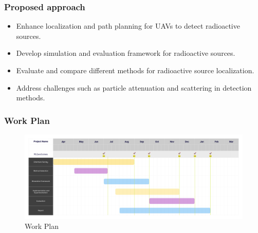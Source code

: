 \documentclass[aspectratio=169]{beamer}
\begin{document}
\begin{frame}
  \frametitle{Proposed approach}
  

  \begin{itemize}
    \item Enhance localization and path planning for UAVs to detect radioactive sources.
    \item Develop simulation and evaluation framework for radioactive sources.
    \item Evaluate and compare different methods for radioactive source localization.
    \item Address challenges such as particle attenuation and scattering in detection methods.
  \end{itemize}
      
  

  
    
\end{frame}

\begin{frame}
\frametitle{Work Plan}
\begin{figure}
  \centering
  \includegraphics[width=1\textwidth]{images/work_plan.jpg}
  \caption{Work Plan}
  \label{fig:work_plan}
\end{figure}
\end{frame}




\end{document}
